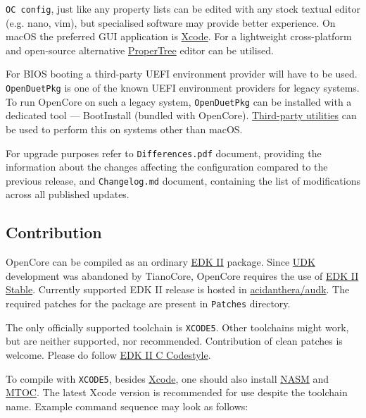 \documentclass[]{article}
\begin{document}
\texttt{OC\ config}, just like any property lists can be edited with any
stock textual editor (e.g. nano, vim), but specialised software may provide
better experience. On macOS the preferred GUI application is
\href{https://developer.apple.com/xcode}{Xcode}. For a lightweight
cross-platform and open-source alternative
\href{https://github.com/corpnewt/ProperTree}{ProperTree} editor can be
utilised.

For BIOS booting a third-party UEFI environment provider will have to
be used. \texttt{OpenDuetPkg} is one of the known UEFI environment providers
for legacy systems. To run OpenCore on such a legacy system, \texttt{OpenDuetPkg}
can be installed with a dedicated tool --- BootInstall (bundled with OpenCore).
\href{https://github.com/corpnewt/gibMacOS}{Third-party utilities} can be used to
perform this on systems other than macOS.

For upgrade purposes refer to \texttt{Differences.pdf} document, providing
the information about the changes affecting the configuration compared
to the previous release, and \texttt{Changelog.md} document, containing
the list of modifications across all published updates.

\subsection{Contribution}\label{configuration-comp}

OpenCore can be compiled as an ordinary
\href{https://github.com/tianocore/tianocore.github.io/wiki/EDK-II}{EDK II} package.
Since \href{https://github.com/tianocore/tianocore.github.io/wiki/UDK}{UDK}
development was abandoned by TianoCore, OpenCore requires the use of
\href{https://github.com/tianocore/tianocore.github.io/wiki/EDK-II#stable-tags}{EDK II Stable}.
Currently supported EDK II release is hosted in
\href{https://github.com/acidanthera/audk}{acidanthera/audk}. The required patches
for the package are present in \texttt{Patches} directory.

The only officially supported toolchain is \texttt{XCODE5}. Other toolchains
might work, but are neither supported, nor recommended. Contribution of clean
patches is welcome. Please do follow
\href{https://github.com/tianocore/tianocore.github.io/wiki/Code-Style-C}{EDK II C Codestyle}.

To compile with \texttt{XCODE5}, besides \href{https://developer.apple.com/xcode}{Xcode},
one should also install \href{https://www.nasm.us}{NASM} and
\href{https://github.com/acidanthera/ocbuild/tree/master/external}{MTOC}.
The latest Xcode version is recommended for use despite the toolchain name. Example
command sequence may look as follows:
\end{document}
